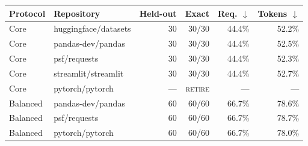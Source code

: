 \begin{tabular}{@{}llrrrr@{}}
\toprule
Protocol & Repository & Held-out & Exact & Req. $\downarrow$ & Tokens $\downarrow$ \\
\midrule
Core & huggingface/datasets & 30 & 30/30 & 44.4\% & 52.2\% \\
Core & pandas-dev/pandas   & 30 & 30/30 & 44.4\% & 52.5\% \\
Core & psf/requests        & 30 & 30/30 & 44.4\% & 52.3\% \\
Core & streamlit/streamlit & 30 & 30/30 & 44.4\% & 52.7\% \\
Core & pytorch/pytorch     & --- & \textsc{retire} & --- & --- \\
\addlinespace[1pt]
Balanced & pandas-dev/pandas & 60 & 60/60 & 66.7\% & 78.6\% \\
Balanced & psf/requests      & 60 & 60/60 & 66.7\% & 78.7\% \\
Balanced & pytorch/pytorch   & 60 & 60/60 & 66.7\% & 78.0\% \\
\bottomrule
\end{tabular}
